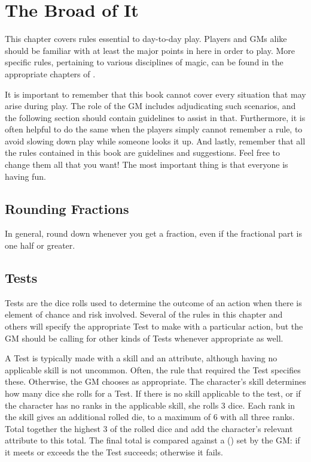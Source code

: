 \chapter{The Broad of It}

This chapter covers rules essential to day-to-day play.
Players and GMs alike should be familiar with at least the major points in here in order to play.
More specific rules, pertaining to various disciplines of magic, can be found in the appropriate chapters of .

It is important to remember that this book cannot cover every situation that may arise during play.
The role of the GM includes adjudicating such scenarios, and the following section should contain guidelines to assist in that.
Furthermore, it is often helpful to do the same when the players simply cannot remember a rule, to avoid slowing down play while someone looks it up.
And lastly, remember that all the rules contained in this book are guidelines and suggestions.
Feel free to change them all that you want!
The most important thing is that everyone is having fun.

\section{Rounding Fractions}

In general, round down whenever you get a fraction, even if the fractional part is one half or greater.

\section{Tests}

Tests are the dice rolls used to determine the outcome of an action when there is element of chance and risk involved.
Several of the rules in this chapter and others will specify the appropriate Test to make with a particular action, but the GM should be calling for other kinds of Tests whenever appropriate as well.

A Test is typically made with a skill and an attribute, although having no applicable skill is not uncommon.
Often, the rule that required the Test specifies these.
Otherwise, the GM chooses as appropriate.
The character's skill determines how many dice she rolls for a Test.
If there is no skill applicable to the test, or if the character has no ranks in the applicable skill, she rolls 3 dice.
Each rank in the skill gives an additional rolled die, to a maximum of 6 with all three ranks.
Total together the highest 3 of the rolled dice and add the character's relevant attribute to this total.
The final total is compared against a {\targetnumber} ({\tn}) set by the GM: if it meets or exceeds the {\tn} the Test succeeds; otherwise it fails.

